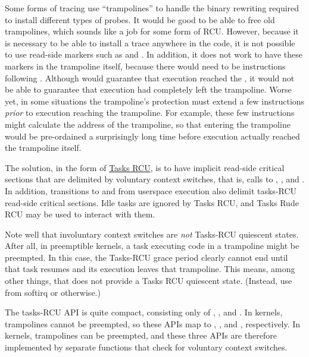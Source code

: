 Some forms of tracing use ``trampolines'' to handle the binary rewriting
required to install different types of probes.
It would be good to be
able to free old trampolines, which sounds like a job for some form of
RCU\@.
However, because it is necessary to be able to install a trace
anywhere in the code, it is not possible to use read-side markers such
as  and .
In addition, it does
not work to have these markers in the trampoline itself, because there
would need to be instructions following .
Although
 would guarantee that execution reached the
, it would not be able to guarantee that execution
had completely left the trampoline.
Worse yet, in some situations
the trampoline's protection must extend a few instructions \emph{prior} to
execution reaching the trampoline.
For example, these few instructions
might calculate the address of the trampoline, so that entering the
trampoline would be pre-ordained a surprisingly long time before execution
actually reached the trampoline itself.

The solution, in the form of
\href{https://lwn.net/Articles/607117/}{Tasks RCU},
is to have implicit read-side
critical sections that are delimited by voluntary context switches, that
is, calls to , , and
.
In addition, transitions to and from
userspace execution also delimit tasks-RCU read-side critical sections.
Idle tasks are ignored by Tasks RCU, and Tasks Rude RCU may be used to
interact with them.

Note well that involuntary context switches are \emph{not} Tasks-RCU quiescent
states.
After all, in preemptible kernels, a task executing code in a
trampoline might be preempted.
In this case, the Tasks-RCU grace period
clearly cannot end until that task resumes and its execution leaves that
trampoline.
This means, among other things, that  does
not provide a Tasks RCU quiescent state.
(Instead, use 
from softirq or  otherwise.)

The tasks-RCU API is quite compact, consisting only of
, , and
.
In  kernels, trampolines
cannot be preempted, so these APIs map to ,
, and , respectively.
In
 kernels, trampolines can be preempted, and these
three APIs are therefore implemented by separate functions that check
for voluntary context switches.


